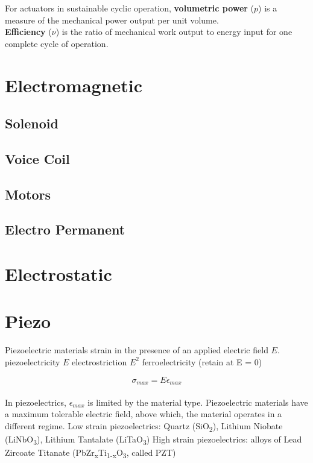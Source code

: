 {For actuators in sustainable cyclic operation, \textbf{volumetric power} ($p$) is a measure of the mechanical power output per unit volume.\\

\textbf{Efficiency} ($\nu$) is the ratio of mechanical work output to energy input for one complete cycle of operation.\\


\section{Electromagnetic}



\subsection{Solenoid}

\subsection{Voice Coil}

\subsection{Motors}

\subsection{Electro Permanent}

\section{Electrostatic}


\section{Piezo}

Piezoelectric materials strain in the presence of an applied electric field $E$.
piezoelectricity $E$
electrostriction $E^{2}$
ferroelectricity (retain at E = 0)

 \begin{equation}\label{eq:diffEq}
\sigma_{max} = E\epsilon_{max}
  \end{equation}
\\
In piezoelectrics, $\epsilon_{max}$ is limited by the material type.  Piezoelectric materials have a maximum tolerable electric field, above which, the material operates in a different regime.
Low strain piezoelectrics: Quartz (SiO\textsubscript{2}), Lithium Niobate (LiNbO\textsubscript{3}), Lithium Tantalate (LiTaO\textsubscript{3})
High strain piezoelectrics: alloys of Lead Zircoate Titanate (PbZr\textsubscript{x}Ti\textsubscript{1-x}O\textsubscript{3}, called PZT)


}
